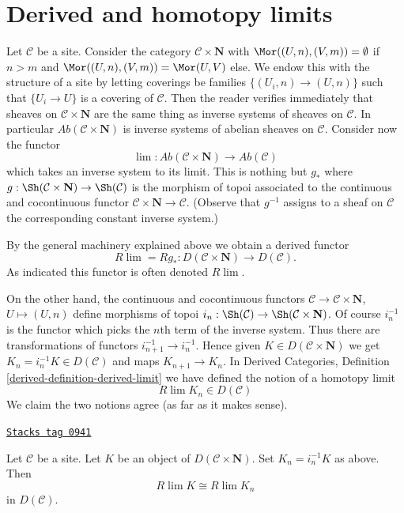 \section{Derived and homotopy limits}
\label{sites-cohomology-section-derived-limits}
Let $\mathcal{C}$ be a site. Consider the category
$\mathcal{C} \times \mathbf{N}$ with
$\Mor((U, n), (V, m)) = \emptyset$ if $n > m$ and
$\Mor((U, n), (V, m)) = \Mor(U, V)$ else. We endow this with the
structure of a site by letting coverings
be families $\{(U_i, n) \to (U, n)\}$ such that
$\{U_i \to U\}$ is a covering of $\mathcal{C}$.
Then the reader verifies immediately that
sheaves on $\mathcal{C} \times \mathbf{N}$ are the same thing
as inverse systems of sheaves on $\mathcal{C}$.
In particular $\textit{Ab}(\mathcal{C} \times \mathbf{N})$
is inverse systems of abelian sheaves on $\mathcal{C}$.
Consider now the functor
$$
\lim : \textit{Ab}(\mathcal{C} \times \mathbf{N}) \to \textit{Ab}(\mathcal{C})
$$
which takes an inverse system to its limit. This is nothing but
$g_*$ where $g : \Sh(\mathcal{C} \times \mathbf{N}) \to \Sh(\mathcal{C})$
is the morphism of topoi associated to the continuous and cocontinuous functor
$\mathcal{C} \times \mathbf{N} \to \mathcal{C}$. (Observe that
$g^{-1}$ assigns to a sheaf on $\mathcal{C}$ the corresponding
constant inverse system.)

\medskip\noindent
By the general machinery explained above we obtain a derived functor
$$
R\lim = Rg_* : D(\mathcal{C} \times \mathbf{N}) \to D(\mathcal{C}).
$$
As indicated this functor is often denoted $R\lim$.

\medskip\noindent
On the other hand, the continuous and cocontinuous functors
$\mathcal{C} \to \mathcal{C} \times \mathbf{N}$,
$U \mapsto (U, n)$ define morphisms of topoi
$i_n : \Sh(\mathcal{C}) \to \Sh(\mathcal{C} \times \mathbf{N})$.
Of course $i_n^{-1}$ is the functor which picks the $n$th term of
the inverse system. Thus there are transformations of functors
$i_{n + 1}^{-1} \to i_n^{-1}$. Hence given
$K \in D(\mathcal{C} \times \mathbf{N})$ we get
$K_n = i_n^{-1}K \in D(\mathcal{C})$ and maps $K_{n + 1} \to K_n$.
In Derived Categories, Definition \ref{derived-definition-derived-limit}
we have defined the notion of a homotopy limit
$$
R\lim K_n \in D(\mathcal{C})
$$
We claim the two notions agree (as far as it makes sense).

\begin{lemma}
\label{sites-cohomology-lemma-derived-limit-is-ok}
\href{https://stacks.math.columbia.edu/tag/0941}{\texttt{Stacks tag 0941}}

Let $\mathcal{C}$ be a site. Let $K$ be an object of
$D(\mathcal{C} \times \mathbf{N})$. Set $K_n = i_n^{-1}K$ as above.
Then
$$
R\lim K \cong R\lim K_n
$$
in $D(\mathcal{C})$.
\end{lemma}

